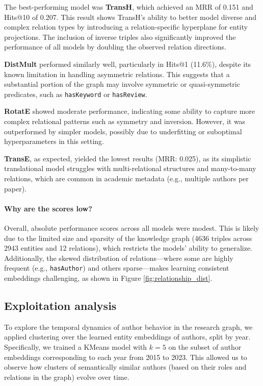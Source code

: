 \documentclass[10pt,a4paper]{article}
\begin{document}
The best-performing model was \textbf{TransH}, which achieved an MRR of 0.151 and Hits@10 of 0.207. This result shows TransH's ability to better model diverse and complex relation types by introducing a relation-specific hyperplane for entity projections. The inclusion of inverse triples also significantly improved the performance of all models by doubling the observed relation directions.

\textbf{DistMult} performed similarly well, particularly in Hits@1 (11.6\%), despite its known limitation in handling asymmetric relations. This suggests that a substantial portion of the graph may involve symmetric or quasi-symmetric predicates, such as \texttt{hasKeyword} or \texttt{hasReview}.

\textbf{RotatE} showed moderate performance, indicating some ability to capture more complex relational patterns such as symmetry and inversion. However, it was outperformed by simpler models, possibly due to underfitting or suboptimal hyperparameters in this setting.

\textbf{TransE}, as expected, yielded the lowest results (MRR: 0.025), as its simplistic translational model struggles with multi-relational structures and many-to-many relations, which are common in academic metadata (e.g., multiple authors per paper).

\paragraph{Why are the scores low?}
Overall, absolute performance scores across all models were modest. This is likely due to the limited size and sparsity of the knowledge graph (4636 triples across 2943 entities and 12 relations), which restricts the models' ability to generalize. Additionally, the skewed distribution of relations—where some are highly frequent (e.g., \texttt{hasAuthor}) and others sparse—makes learning consistent embeddings challenging, as shown in Figure \ref{fig:relationship_dist}.

\subsection{Exploitation analysis}

To explore the temporal dynamics of author behavior in the research graph, we applied clustering over the learned entity embeddings of authors, split by year. Specifically, we trained a KMeans model with $k=5$ on the subset of author embeddings corresponding to each year from 2015 to 2023. This allowed us to observe how clusters of semantically similar authors (based on their roles and relations in the graph) evolve over time.
\end{document}
